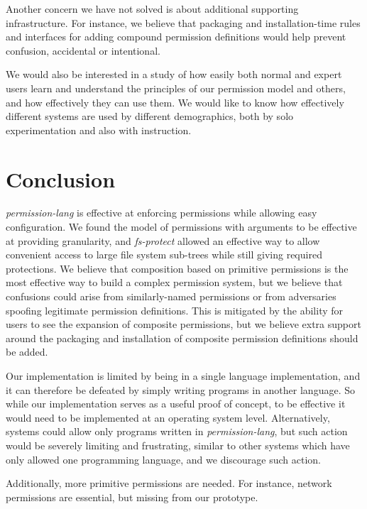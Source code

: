 Another concern we have not solved is about additional supporting infrastructure.  For instance, we believe that packaging and installation-time rules and interfaces for adding compound permission definitions would help prevent confusion, accidental or intentional.

We would also be interested in a study of how easily both normal and expert users learn and understand the principles of our permission model and others, and how effectively they can use them.  
We would like to know how effectively different systems are used by different demographics, both by solo experimentation and also with instruction.



\section{Conclusion}\label{section:conclusion}
\textit{permission-lang} is effective at enforcing permissions while allowing easy configuration.  We found the model of permissions with arguments to be effective at providing granularity, and \textit{fs-protect} allowed an effective way to allow convenient access to large file system sub-trees while still giving required protections.
We believe that composition based on primitive permissions is the most effective way to build a complex permission system, but we believe that confusions could arise from similarly-named permissions or from adversaries spoofing legitimate permission definitions.  This is mitigated by the ability for users to see the expansion of composite permissions, but we believe extra support around the packaging and installation of composite permission definitions should be added.

Our implementation is limited by being in a single language implementation, and it can therefore be defeated by simply writing programs in another language.  So while our implementation serves as a useful proof of concept, to be effective it would need to be implemented at an operating system level.  Alternatively, systems could allow only programs written in \textit{permission-lang}, but such action would be severely limiting and frustrating, similar to other systems which have only allowed one programming language, and we discourage such action.  

Additionally, more primitive permissions are needed.  For instance, network permissions are essential, but missing from our prototype.




